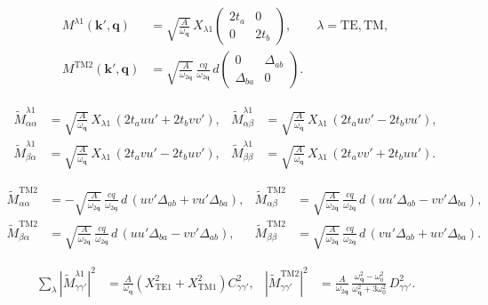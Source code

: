 \documentclass[a4paper,10pt]{article}
\begin{document}
\begin{align}
M^{\lambda 1}(\mathbf{k}',\mathbf{q}) &= \sqrt{\frac{A}{\omega_{\mathbf{q}}}}\,X_{\lambda 1}
\begin{pmatrix} 2t_a & 0\\ 0 & 2t_b \end{pmatrix}, \qquad \lambda = \mathrm{TE},\mathrm{TM},\\
M^{\mathrm{TM2}}(\mathbf{k}',\mathbf{q}) &= \sqrt{\frac{A}{\omega_{2\mathbf{q}}}}\,\frac{cq}{\omega_{2\mathbf{q}}}\,d
\begin{pmatrix} 0 & \Delta_{ab}\\ \Delta_{ba} & 0 \end{pmatrix}.
\end{align}

\begin{align}
\widetilde{M}^{\lambda 1}_{\alpha\alpha} &= \sqrt{\frac{A}{\omega_{\mathbf{q}}}}\,X_{\lambda 1}\,(2t_a uu' + 2t_b vv'), &
\widetilde{M}^{\lambda 1}_{\alpha\beta} &= \sqrt{\frac{A}{\omega_{\mathbf{q}}}}\,X_{\lambda 1}\,(2t_a uv' - 2t_b vu'),\\
\widetilde{M}^{\lambda 1}_{\beta\alpha} &= \sqrt{\frac{A}{\omega_{\mathbf{q}}}}\,X_{\lambda 1}\,(2t_a vu' - 2t_b uv'), &
\widetilde{M}^{\lambda 1}_{\beta\beta} &= \sqrt{\frac{A}{\omega_{\mathbf{q}}}}\,X_{\lambda 1}\,(2t_a vv' + 2t_b uu').
\end{align}

\begin{align}
\widetilde{M}^{\mathrm{TM2}}_{\alpha\alpha} &= -\sqrt{\frac{A}{\omega_{2\mathbf{q}}}}\,\frac{cq}{\omega_{2\mathbf{q}}}\,d\,(uv'\Delta_{ab} + vu'\Delta_{ba}), &
\widetilde{M}^{\mathrm{TM2}}_{\alpha\beta} &= \sqrt{\frac{A}{\omega_{2\mathbf{q}}}}\,\frac{cq}{\omega_{2\mathbf{q}}}\,d\,(uu'\Delta_{ab} - vv'\Delta_{ba}),\\
\widetilde{M}^{\mathrm{TM2}}_{\beta\alpha} &= \sqrt{\frac{A}{\omega_{2\mathbf{q}}}}\,\frac{cq}{\omega_{2\mathbf{q}}}\,d\,(uu'\Delta_{ba} - vv'\Delta_{ab}), &
\widetilde{M}^{\mathrm{TM2}}_{\beta\beta} &= \sqrt{\frac{A}{\omega_{2\mathbf{q}}}}\,\frac{cq}{\omega_{2\mathbf{q}}}\,d\,(vu'\Delta_{ab} + uv'\Delta_{ba}).
\end{align}

\begin{align}
\sum_{\lambda}\left|\widetilde{M}^{\lambda 1}_{\gamma\gamma'}\right|^2
&= \frac{A}{\omega_{\mathbf{q}}}\left(X_{\mathrm{TE1}}^2 + X_{\mathrm{TM1}}^2\right) C_{\gamma\gamma'}^2, &
\left|\widetilde{M}^{\mathrm{TM2}}_{\gamma\gamma'}\right|^2
&= \frac{A}{\omega_{2\mathbf{q}}}\,\frac{\omega_{\mathbf{q}}^2-\omega_0^2}{\omega_{\mathbf{q}}^2+3\omega_0^2}\, D_{\gamma\gamma'}^2 .
\end{align}
\end{document}
